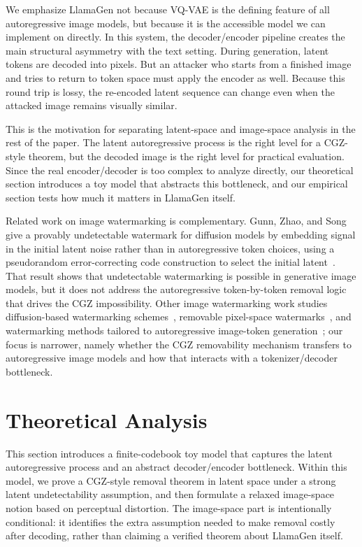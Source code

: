 \documentclass[12pt]{article}
\begin{document}
We emphasize LlamaGen not because VQ-VAE is the defining feature of all
autoregressive image models, but because it is the accessible model we
can implement on directly. In this system, the decoder/encoder pipeline
creates the main structural asymmetry with the text setting. During
generation, latent tokens are decoded into pixels. But an attacker who
starts from a finished image and tries to return to token space must
apply the encoder as well. Because this round trip is lossy, the
re-encoded latent sequence can change even when the attacked image
remains visually similar.

This is the motivation for separating latent-space and image-space
analysis in the rest of the paper. The latent autoregressive process is
the right level for a CGZ-style theorem, but the decoded image is the
right level for practical evaluation. Since the real encoder/decoder is
too complex to analyze directly, our theoretical section introduces a
toy model that abstracts this bottleneck, and our empirical section
tests how much it matters in LlamaGen itself.

Related work on image watermarking is complementary. Gunn, Zhao, and
Song give a provably undetectable watermark for diffusion models by
embedding signal in the initial latent noise rather than in
autoregressive token choices, using a pseudorandom error-correcting
code construction to select the initial latent~\cite{gunnzhaosong2025,prc2024}.
That result shows that undetectable watermarking is possible in
generative image models, but it does not address the autoregressive
token-by-token removal logic that drives the CGZ impossibility. Other
image watermarking work studies diffusion-based watermarking
schemes~\cite{wen2023,fernandez2023}, removable pixel-space
watermarks~\cite{zhao2024removable}, and watermarking methods tailored
to autoregressive image-token generation~\cite{jovanovic2025}; our
focus is narrower, namely whether the CGZ removability mechanism
transfers to autoregressive image models and how that interacts with a
tokenizer/decoder bottleneck.

\section{Theoretical Analysis}

This section introduces a finite-codebook toy model that captures the
latent autoregressive process and an abstract decoder/encoder
bottleneck. Within this model, we prove a CGZ-style removal theorem in
latent space under a strong latent undetectability assumption, and then
formulate a relaxed image-space notion based on perceptual distortion.
The image-space part is intentionally conditional: it identifies the
extra assumption needed to make removal costly after decoding, rather
than claiming a verified theorem about LlamaGen itself.
\end{document}
